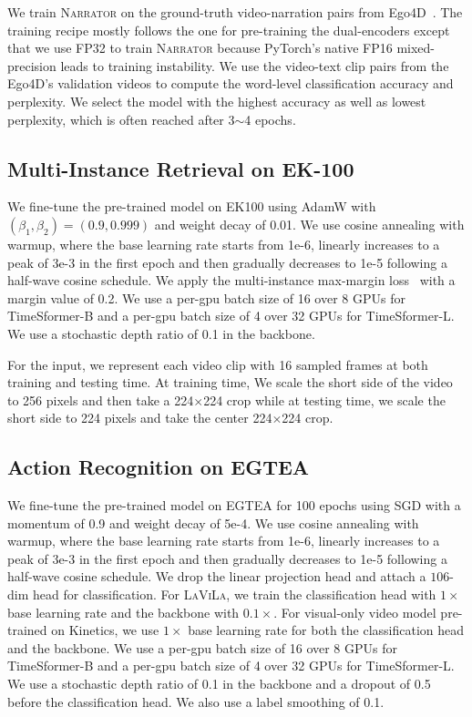 \documentclass[10pt,twocolumn,letterpaper]{article}
\newcommand{\ours}{\textsc{LaViLa}\xspace}
\newcommand{\narrator}{\textsc{Narrator}\xspace}
\begin{document}
We train \narrator on the ground-truth video-narration pairs from Ego4D~\cite{grauman2022ego4d}.
The training recipe mostly follows the one for pre-training the dual-encoders except that we use FP32 to train \narrator because PyTorch's native FP16 mixed-precision leads to training instability.
We use the video-text clip pairs from the Ego4D's validation videos to compute the word-level classification accuracy and perplexity.
We select the model with the highest accuracy as well as lowest perplexity, which is often reached after 3$\sim$4 epochs.

\subsection{Multi-Instance Retrieval on EK-100}
We fine-tune the pre-trained model on EK100 using AdamW with $(\beta_1,\beta_2)=(0.9, 0.999)$ and weight decay of 0.01.
We use cosine annealing with warmup, where the base learning rate starts from 1e-6, linearly increases to a peak of 3e-3 in the first epoch and then gradually decreases to 1e-5 following a half-wave cosine schedule.
We apply the multi-instance max-margin loss~\cite{wray2019jpose} with a margin value of 0.2.
We use a per-gpu batch size of 16 over 8 GPUs for TimeSformer-B and a per-gpu batch size of 4 over 32 GPUs for TimeSformer-L.
We use a stochastic depth ratio of 0.1 in the backbone.

For the input, we represent each video clip with 16 sampled frames at both training and testing time.
At training time, We scale the short side of the video to 256 pixels and then take a 224$\times$224 crop while at testing time, we scale the short side to 224 pixels and take the center 224$\times$224 crop.

\subsection{Action Recognition on EGTEA}
We fine-tune the pre-trained model on EGTEA for 100 epochs using SGD with a momentum of 0.9 and weight decay of 5e-4.
We use cosine annealing with warmup, where the base learning rate starts from 1e-6, linearly increases to a peak of 3e-3 in the first epoch and then gradually decreases to 1e-5 following a half-wave cosine schedule.
We drop the linear projection head and attach a $106$-dim head for classification.
For \ours, we train the classification head with $1\times$ base learning rate and the backbone with $0.1\times$.
For visual-only video model pre-trained on Kinetics, we use $1\times$ base learning rate  for both the classification head and the backbone.
We use a per-gpu batch size of 16 over 8 GPUs for TimeSformer-B and a per-gpu batch size of 4 over 32 GPUs for TimeSformer-L.
We use a stochastic depth ratio of 0.1 in the backbone and a dropout of 0.5 before the classification head.
We also use a label smoothing of 0.1.
\end{document}
